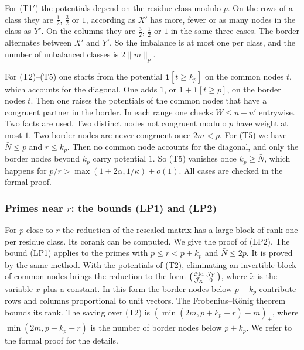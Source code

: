 \documentclass[11pt]{amsart}
\theoremstyle{definition}
\theoremstyle{remark}
\numberwithin{equation}{section}
\newcommand{\Id}{\mathrm{Id}}
\begin{document}
For (T1$'$) the potentials depend on the residue class modulo $p$. On the rows of a class they are $\frac12$,
$\frac32$ or $1$, according as $X'$ has more, fewer or as many nodes in the class as $Y'$. On the columns they are
$\frac32$, $\frac12$ or $1$ in the same three cases. The border alternates between $X'$ and $Y'$. So the imbalance is
at most one per class, and the number of unbalanced classes is $2\|m\|_p$.

For (T2)--(T5) one starts from the potential $\mathbf 1[t\ge k_p]$ on the common nodes $t$, which accounts for the diagonal.
One adds $1$, or $1+\mathbf 1[t\ge p]$, on the border nodes $t$. Then one raises the potentials of the common nodes that
have a congruent partner in the border. In each range one checks $W\le u+u'$ entrywise. Two facts are used. Two distinct
nodes not congruent modulo $p$ have weight at most $1$. Two border nodes are never congruent once $2m<p$. For (T5) we
have $\bar N\le p$ and $r\le k_p$. Then no common node accounts for the diagonal, and only the border nodes beyond $k_p$ carry
potential $1$. So (T5) vanishes once $k_p\ge \bar N$, which happens for $p/r>\max(1+2\alpha,1/\kappa)+o(1)$. All cases are
checked in the formal proof.

\subsubsection{Primes near $r$: the bounds (LP1) and (LP2)}\label{sssec:lp}
For $p$ close to $r$ the reduction of the rescaled matrix has a large block of rank one per residue class. Its corank
can be computed. We give the proof of (LP2). The bound (LP1) applies to the primes with $p\le r<p+k_p$ and $\bar N\le2p$. It
is proved by the same method. With the potentials of (T2), eliminating an invertible block of common nodes brings the
reduction to the form $\begin{psmallmatrix}\tilde x\Id&\mathcal J_Y\\ \mathcal J_X&0\end{psmallmatrix}$, where $\tilde x$
is the variable $x$ plus a constant. In this form the border nodes below $p+k_p$ contribute rows and columns
proportional to unit vectors. The Frobenius--K\"onig theorem bounds its rank. The saving over (T2) is
$(\min(2m,p+k_p-r)-m)_+$, where $\min(2m,p+k_p-r)$ is the number of border nodes below $p+k_p$. We refer to the formal
proof for the details.
\end{document}
